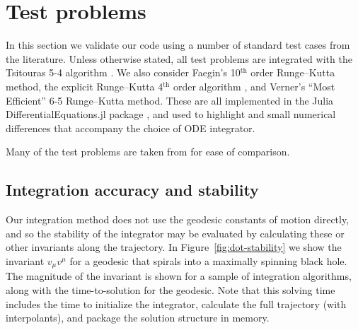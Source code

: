\documentclass[fleqn,usenatbib]{mnras}
\begin{document}
\section{Test problems}
\label{sec:test-problems}

In this section we validate our code using a number of standard test cases from
the literature. Unless otherwise stated, all test problems are integrated with
the Tsitouras 5-4 algorithm \citep{tsitouras_rungekutta_2011}. We also consider
Faegin's 10$^\text{th}$ order Runge--Kutta method, the explicit Runge--Kutta
4$^\text{th}$ order algorithm \citep{press_numerical_2007}, and Verner's ``Most
Efficient'' 6-5 Runge--Kutta method.  These are all implemented in the Julia
DifferentialEquations.jl package \citep{rackauckas_differential_2017}, and used
to highlight and small numerical differences that accompany the choice of ODE
integrator.

Many of the test problems are taken from \citet{gold_verification_2020} for ease
of comparison.

\subsection{Integration accuracy and stability}

Our integration method does not use the geodesic constants of motion directly,
and so the stability of the integrator may be evaluated by calculating these or
other invariants along the trajectory. In Figure~\ref{fig:dot-stability} we show
the invariant $v_\mu v^\mu$ for a geodesic that spirals into a maximally
spinning black hole. The magnitude of the invariant is shown for a sample of
integration algorithms, along with the time-to-solution for the geodesic. Note
that this solving time includes the time to initialize the integrator, calculate
the full trajectory (with interpolants), and package the solution structure in
memory.
\end{document}
